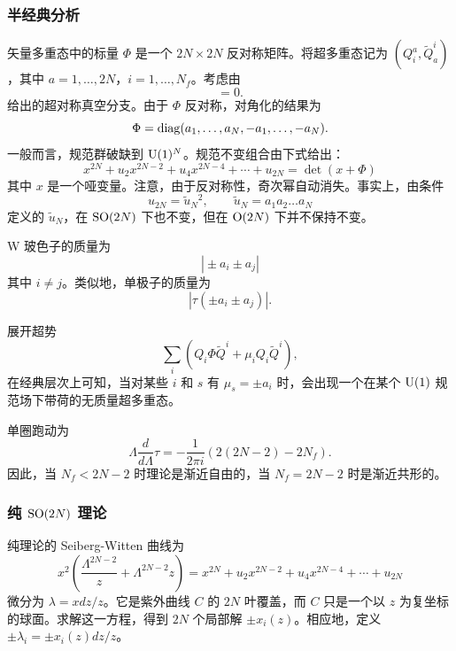 \subsubsection{半经典分析}
矢量多重态中的标量 $\Phi$ 是一个 $2N\times2N$ 反对称矩阵。将超多重态记为 $(Q_i^a,\tilde Q^i_a)$，其中 $a=1,\ldots,2N$，$i=1,\ldots,N_f$。考虑由
\begin{equation}
[\Phi,\Phi^\dagger]=0.
\end{equation}
给出的超对称真空分支。由于 $\Phi$ 反对称，对角化的结果为
\begin{equation}
\Phi=\mathop{\mathrm{diag}}(a_1,\ldots,a_N,-a_1,\ldots,-a_N).
\end{equation}
一般而言，规范群破缺到 ${\mathrm{U}}(1)^N$。规范不变组合由下式给出：
\begin{equation}
x^{2N}+u_2x^{2N-2}+u_4x^{2N-4}+\cdots+u_{2N}=\det(x+\Phi)
\end{equation}
其中 $x$ 是一个哑变量。注意，由于反对称性，奇次幂自动消失。事实上，由条件
\begin{equation}
u_{2N}=\tilde u_N{}^2,\qquad\tilde u_N=a_1a_2\ldots a_N
\end{equation}
定义的 $\tilde u_N$，在 $\mathop{\mathrm{SO}}(2N)$ 下也不变，但在 $\mathrm{O}(2N)$ 下并不保持不变。

W 玻色子的质量为
\begin{equation}
|{}\pm a_i\pm a_j|
\end{equation}
其中 $i\neq j$。类似地，单极子的质量为
\begin{equation}
|\tau(\pm a_i\pm a_j)|.
\end{equation}

展开超势
\begin{equation}
\sum_i(Q_i\Phi\tilde Q^i+\mu_iQ_i\tilde Q^i),
\end{equation}
在经典层次上可知，当对某些 $i$ 和 $s$ 有 $\mu_s=\pm a_i$ 时，会出现一个在某个 ${\mathrm{U}}(1)$ 规范场下带荷的无质量超多重态。

单圈跑动为
\begin{equation}
\Lambda\frac d{d\Lambda}\tau=-\frac1{2\pi i}(2(2N-2)-2N_f).
\end{equation}
因此，当 $N_f<2N-2$ 时理论是渐近自由的，当 $N_f=2N-2$ 时是渐近共形的。

\subsubsection{纯 $\mathop{\mathrm{SO}}(2N)$ 理论}\label{sec:pureSON}
纯理论的 Seiberg-Witten 曲线为
\begin{equation}
x^2(\frac{\Lambda^{2N-2}}z+\Lambda^{2N-2}z)
=x^{2N}+u_2x^{2N-2}+u_4x^{2N-4}+\cdots+u_{2N}\label{pureSOcurve}
\end{equation}
微分为 $\lambda=xdz/z$。它是紫外曲线 $C$ 的 $2N$ 叶覆盖，而 $C$ 只是一个以 $z$ 为复坐标的球面。求解这一方程，得到 $2N$ 个局部解 $\pm x_i(z)$。相应地，定义 $\pm\lambda_i=\pm x_i(z)dz/z$。

